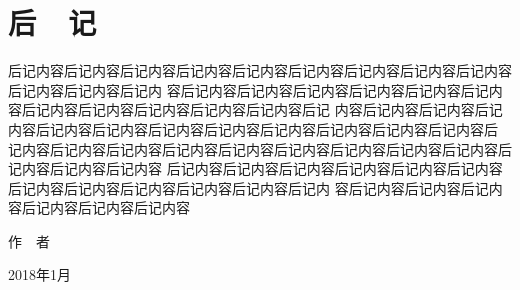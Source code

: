 \documentclass[utf8]{book}
\begin{document}
\chapter{后~~记}

后记内容后记内容后记内容后记内容后记内容后记内容后记内容后记内容后记内容后记内容后记内容后记内
容后记内容后记内容后记内容后记内容后记内容后记内容后记内容后记内容后记内容后记内容后记内容后记
内容后记内容后记内容后记内容后记内容后记内容后记内容后记内容后记内容后记内容后记内容后记内容后
记内容后记内容后记内容后记内容后记内容后记内容后记内容后记内容后记内容后记内容后记内容后记内容
后记内容后记内容后记内容后记内容后记内容后记内容后记内容后记内容后记内容后记内容后记内容后记内
容后记内容后记内容后记内容后记内容后记内容后记内容

\begin{flushright}
作~~者~~~~~~~~~

2018年1月~~~~~
\end{flushright}
\end{document}
